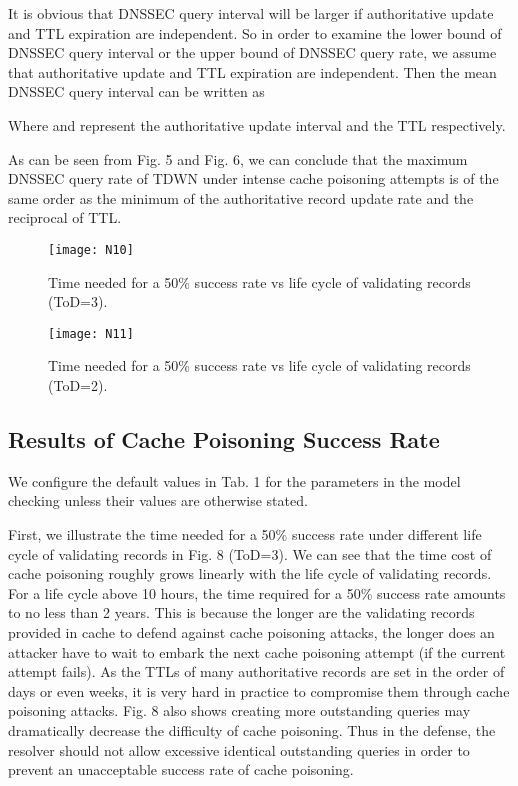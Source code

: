 \documentclass[conference]{IEEEtran}
\begin{document}
It is obvious that DNSSEC query interval will be larger if authoritative update and TTL expiration are independent. So in order to examine the lower bound of DNSSEC query interval or the upper bound of DNSSEC query rate, we assume that authoritative update and TTL expiration are independent. Then the mean DNSSEC query interval can be written as

Where   and   represent the authoritative update interval and the TTL respectively.


As can be seen from Fig. 5 and Fig. 6, we can conclude that the maximum DNSSEC query rate of TDWN under intense cache poisoning attempts is of the same order as the minimum of the authoritative record update rate and the reciprocal of TTL.

\begin{figure}[!t]\begin{minipage}[t]{0.48\linewidth}
\centering
\texttt{[image: N10]}
\vspace{-1em}
\caption{Time needed for a 50\% success rate vs life cycle of validating records (ToD=3).}
\vspace{-2em}
\end{minipage}
\hspace{0.3cm}
\begin{minipage}[t]{0.48\linewidth}
\centering
\texttt{[image: N11]}
\caption{Time needed for a 50\% success rate vs life cycle of validating records (ToD=2).}
\vspace{-2em}
\end{minipage}
\end{figure}

\subsection{Results of Cache Poisoning Success Rate}

We configure the default values in Tab. 1 for the parameters in the model checking unless their values are otherwise stated.


First, we illustrate the time needed for a 50\% success rate under different life cycle of validating records in Fig. 8 (ToD=3).  We can see that the time cost of cache poisoning roughly grows linearly with the life cycle of validating records. For a life cycle above 10 hours, the time required for a 50\% success rate amounts to no less than 2 years. This is because the longer are the validating records  provided in cache to defend against cache poisoning attacks, the longer does an attacker have to wait to embark the next cache poisoning attempt (if the current attempt fails). As the TTLs of many authoritative records are set in the order of days or even weeks, it is very hard in practice to compromise them through cache poisoning attacks. Fig. 8 also shows creating more outstanding queries may dramatically decrease the difficulty of cache poisoning. Thus in the defense, the resolver should not allow excessive identical outstanding queries in order to prevent an unacceptable success rate of cache poisoning.
\end{document}
